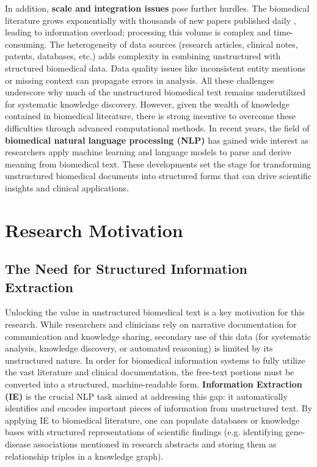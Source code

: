 In addition, \textbf{scale and integration issues} pose further hurdles. The biomedical literature grows exponentially with thousands of new papers published daily \parencite{Kong2019}, leading to information overload; processing this volume is complex and time-consuming. The heterogeneity of data sources (research articles, clinical notes, patents, databases, etc.) adds complexity in combining unstructured with structured biomedical data. Data quality issues like inconsistent entity mentions or missing context can propagate errors in analysis. All these challenges underscore why much of the unstructured biomedical text remains underutilized for systematic knowledge discovery. However, given the wealth of knowledge contained in biomedical literature, there is strong incentive to overcome these difficulties through advanced computational methods. In recent years, the field of \textbf{biomedical natural language processing (NLP)} has gained wide interest as researchers apply machine learning and language models to parse and derive meaning from biomedical text. These developments set the stage for transforming unstructured biomedical documents into structured forms that can drive scientific insights and clinical applications.


\section{Research Motivation}

\subsection{The Need for Structured Information Extraction}

Unlocking the value in unstructured biomedical text is a key motivation for this research. While researchers and clinicians rely on narrative documentation for communication and knowledge sharing, secondary use of this data (for systematic analysis, knowledge discovery, or automated reasoning) is limited by its unstructured nature. In order for biomedical information systems to fully utilize the vast literature and clinical documentation, the free-text portions must be converted into a structured, machine-readable form. \textbf{Information Extraction (IE)} is the crucial NLP task aimed at addressing this gap: it automatically identifies and encodes important pieces of information from unstructured text. By applying IE to biomedical literature, one can populate databases or knowledge bases with structured representations of scientific findings (e.g. identifying gene-disease associations mentioned in research abstracts and storing them as relationship triples in a knowledge graph).

